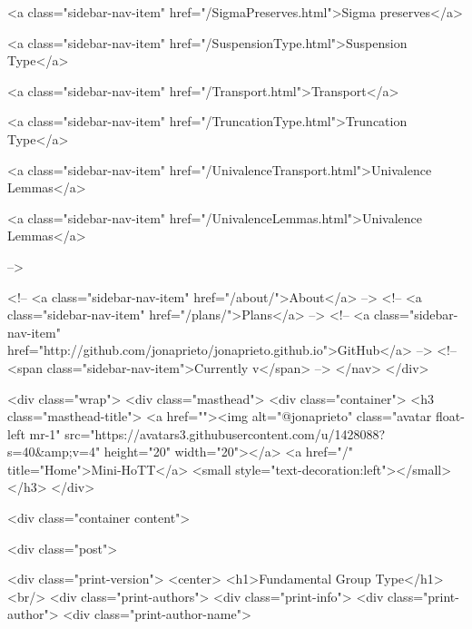       
        
          <a class="sidebar-nav-item" href="/SigmaPreserves.html">Sigma preserves</a>
        
      
    
      
        
          <a class="sidebar-nav-item" href="/SuspensionType.html">Suspension Type</a>
        
      
    
      
        
          <a class="sidebar-nav-item" href="/Transport.html">Transport</a>
        
      
    
      
        
          <a class="sidebar-nav-item" href="/TruncationType.html">Truncation Type</a>
        
      
    
      
        
          <a class="sidebar-nav-item" href="/UnivalenceTransport.html">Univalence Lemmas</a>
        
      
    
      
        
          <a class="sidebar-nav-item" href="/UnivalenceLemmas.html">Univalence Lemmas</a>
        
      
     -->

    <!-- <a class="sidebar-nav-item" href="/about/">About</a> -->
    <!-- <a class="sidebar-nav-item" href="/plans/">Plans</a> -->
    <!-- <a class="sidebar-nav-item" href="http://github.com/jonaprieto/jonaprieto.github.io">GitHub</a> -->
    <!-- <span class="sidebar-nav-item">Currently v</span> -->
  </nav>
</div>

    <div class="wrap">
      <div class="masthead">
        <div class="container">
          <h3 class="masthead-title">
            <a href=""><img alt="@jonaprieto" class="avatar float-left mr-1" src="https://avatars3.githubusercontent.com/u/1428088?s=40&amp;v=4" height="20" width="20"></a>
            <a href="/" title="Home">Mini-HoTT</a>
            <small style="text-decoration:left"></small>
          </h3>
        </div>
      
      <div class="container content">
        







<div class="post">

  <div class="print-version">
    <center>
      <h1>Fundamental Group Type</h1><br/>
        <div class="print-authors">
          <div class="print-info">
            <div class="print-author">
              <div class="print-author-name">
                
